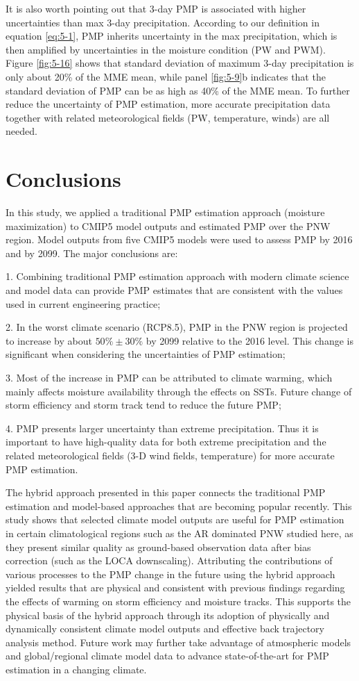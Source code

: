 It is also worth pointing out that 3-day PMP is associated with higher uncertainties than max 3-day precipitation. According to our definition in equation \ref{eq:5-1}, PMP inherits uncertainty in the max precipitation, which is then amplified by uncertainties in the moisture condition (PW and PWM). Figure \ref{fig:5-16} shows that standard deviation of maximum 3-day precipitation is only about 20\% of the MME mean, while panel \ref{fig:5-9}b indicates that the standard deviation of PMP can be as high as 40\% of the MME mean. To further reduce the uncertainty of PMP estimation, more accurate precipitation data together with related meteorological fields (PW, temperature, winds) are all needed.

\section{Conclusions}

In this study, we applied a traditional PMP estimation approach (moisture maximization) to CMIP5 model outputs and estimated PMP over the PNW region. Model outputs from five CMIP5 models were used to assess PMP by 2016 and by 2099. The major conclusions are:

1.	Combining traditional PMP estimation approach with modern climate science and model data can provide PMP estimates that are consistent with the values used in current engineering practice;

2.	In the worst climate scenario (RCP8.5), PMP in the PNW region is projected to increase by about $50\%\pm30\%$ by 2099 relative to the 2016 level. This change is significant when considering the uncertainties of PMP estimation;

3.	Most of the increase in PMP can be attributed to climate warming, which mainly affects moisture availability through the effects on SSTs. Future change of storm efficiency and storm track tend to reduce the future PMP;

4.	PMP presents larger uncertainty than extreme precipitation. Thus it is important to have high-quality data for both extreme precipitation and the related meteorological fields (3-D wind fields, temperature) for more accurate PMP estimation.

The hybrid approach presented in this paper connects the traditional PMP estimation and model-based approaches that are becoming popular recently. This study shows that selected climate model outputs are useful for PMP estimation in certain climatological regions such as the AR dominated PNW studied here, as they present similar quality as ground-based observation data after bias correction (such as the LOCA downscaling). Attributing the contributions of various processes to the PMP change in the future using the hybrid approach yielded results that are physical and consistent with previous findings regarding the effects of warming on storm efficiency and moisture tracks. This supports the physical basis of the hybrid approach through its adoption of physically and dynamically consistent climate model outputs and effective back trajectory analysis method. Future work may further take advantage of atmospheric models and global/regional climate model data to advance state-of-the-art for PMP estimation in a changing climate.